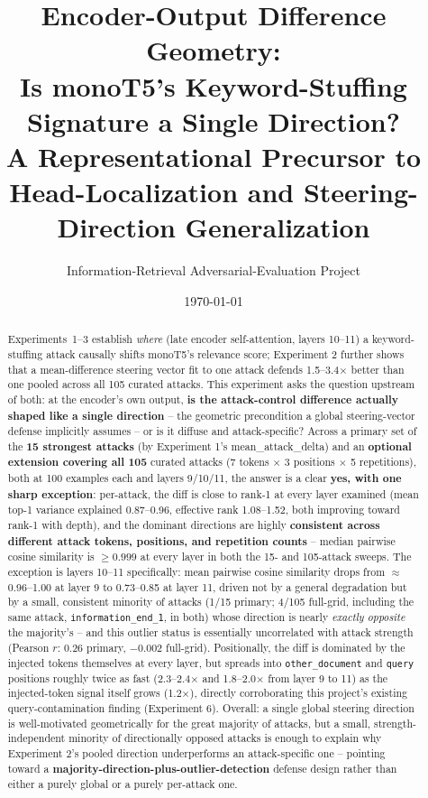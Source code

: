 \documentclass[11pt]{article}
\title{\textbf{Encoder-Output Difference Geometry: \\[2pt]
Is monoT5's Keyword-Stuffing Signature a Single Direction?} \\[6pt]
\large A Representational Precursor to Head-Localization and Steering-Direction Generalization}
\author{Information-Retrieval Adversarial-Evaluation Project}
\date{\today}
\begin{document}
\maketitle

\begin{abstract}
Experiments~1--3 establish \emph{where} (late encoder self-attention,
layers 10--11) a keyword-stuffing attack causally shifts monoT5's
relevance score; Experiment 2 further shows that a mean-difference
steering vector fit to one attack defends 1.5--3.4$\times$ better than one
pooled across all 105 curated attacks. This experiment asks the question
upstream of both: at the encoder's own output, \textbf{is the
attack-control difference actually shaped like a single direction} --
the geometric precondition a global steering-vector defense implicitly
assumes -- or is it diffuse and attack-specific? Across a primary set of
the \textbf{15 strongest attacks} (by Experiment 1's mean\_attack\_delta)
and an \textbf{optional extension covering all 105} curated attacks (7
tokens $\times$ 3 positions $\times$ 5 repetitions), both at 100 examples
each and layers 9/10/11, the answer is a clear \textbf{yes, with one
sharp exception}: per-attack, the diff is close to rank-1 at every layer
examined (mean top-1 variance explained 0.87--0.96, effective rank
1.08--1.52, both improving toward rank-1 with depth), and the dominant
directions are highly \textbf{consistent across different attack tokens,
positions, and repetition counts} -- median pairwise cosine similarity is
$\geq 0.999$ at every layer in both the 15- and 105-attack sweeps. The
exception is layers 10--11 specifically: mean pairwise cosine similarity
drops from $\approx$0.96--1.00 at layer 9 to 0.73--0.85 at layer 11, driven
not by a general degradation but by a small, consistent minority of
attacks (1/15 primary; 4/105 full-grid, including the same attack,
\texttt{information\_end\_1}, in both) whose direction is nearly
\emph{exactly opposite} the majority's -- and this outlier status is
essentially uncorrelated with attack strength (Pearson $r$: 0.26 primary,
$-0.002$ full-grid). Positionally, the diff is dominated by the injected
tokens themselves at every layer, but spreads into \texttt{other\_document}
and \texttt{query} positions roughly twice as fast (2.3--2.4$\times$ and
1.8--2.0$\times$ from layer 9 to 11) as the injected-token signal itself
grows (1.2$\times$), directly corroborating this project's existing
query-contamination finding (Experiment 6). Overall: a single global
steering direction is well-motivated geometrically for the great majority
of attacks, but a small, strength-independent minority of directionally
opposed attacks is enough to explain why Experiment 2's pooled direction
underperforms an attack-specific one -- pointing toward a
\textbf{majority-direction-plus-outlier-detection} defense design rather
than either a purely global or a purely per-attack one.
\end{abstract}
\end{document}
